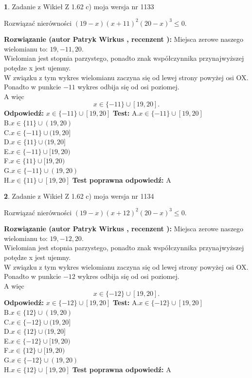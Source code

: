 \documentclass[12pt, a4paper]{article}
\theoremstyle{definition} %
\newtheorem{zad}{}
\newcommand{\zadStart}[1]{\begin{zad}#1\newline}
\newcommand{\zadStop}{\end{zad}}
\newcommand{\rozwStart}[2]{\noindent \textbf{Rozwiązanie (autor #1 , recenzent #2): }\newline}
\newcommand{\rozwStop}{\newline}
\newcommand{\odpStart}{\noindent \textbf{Odpowiedź:}\newline}
\newcommand{\odpStop}{\newline}
\newcommand{\testStart}{\noindent \textbf{Test:}\newline}
\newcommand{\testStop}{\newline}
\newcommand{\kluczStart}{\noindent \textbf{Test poprawna odpowiedź:}\newline}
\newcommand{\kluczStop}{\newline}
\begin{document}
\zadStart{Zadanie z Wikieł Z 1.62 c) moja wersja nr 1133}

Rozwiązać nierówności $(19-x)(x+11)^{2}(20-x)^{3}\le0$.
\zadStop
\rozwStart{Patryk Wirkus}{}
Miejsca zerowe naszego wielomianu to: $19, -11, 20$.\\
Wielomian jest stopnia parzystego, ponadto znak współczynnika przy\linebreak najwyższej potędze x jest ujemny.\\ W związku z tym wykres wielomianu zaczyna się od lewej strony powyżej osi OX.\\
Ponadto w punkcie $-11$ wykres odbija się od osi poziomej.\\
A więc $$x \in \{-11\} \cup [19,20].$$
\rozwStop
\odpStart
$x \in \{-11\} \cup [19,20]$
\odpStop
\testStart
A.$x \in \{-11\} \cup [19,20]$\\
B.$x \in \{11\} \cup (19,20)$\\
C.$x \in \{-11\} \cup (19,20]$\\
D.$x \in \{11\} \cup (19,20]$\\
E.$x \in \{-11\} \cup [19,20)$\\
F.$x \in \{11\} \cup [19,20)$\\
G.$x \in \{-11\} \cup (19,20)$\\
H.$x \in \{11\} \cup [19,20]$
\testStop
\kluczStart
A
\kluczStop



\zadStart{Zadanie z Wikieł Z 1.62 c) moja wersja nr 1134}

Rozwiązać nierówności $(19-x)(x+12)^{2}(20-x)^{3}\le0$.
\zadStop
\rozwStart{Patryk Wirkus}{}
Miejsca zerowe naszego wielomianu to: $19, -12, 20$.\\
Wielomian jest stopnia parzystego, ponadto znak współczynnika przy\linebreak najwyższej potędze x jest ujemny.\\ W związku z tym wykres wielomianu zaczyna się od lewej strony powyżej osi OX.\\
Ponadto w punkcie $-12$ wykres odbija się od osi poziomej.\\
A więc $$x \in \{-12\} \cup [19,20].$$
\rozwStop
\odpStart
$x \in \{-12\} \cup [19,20]$
\odpStop
\testStart
A.$x \in \{-12\} \cup [19,20]$\\
B.$x \in \{12\} \cup (19,20)$\\
C.$x \in \{-12\} \cup (19,20]$\\
D.$x \in \{12\} \cup (19,20]$\\
E.$x \in \{-12\} \cup [19,20)$\\
F.$x \in \{12\} \cup [19,20)$\\
G.$x \in \{-12\} \cup (19,20)$\\
H.$x \in \{12\} \cup [19,20]$
\testStop
\kluczStart
A
\kluczStop
\end{document}
